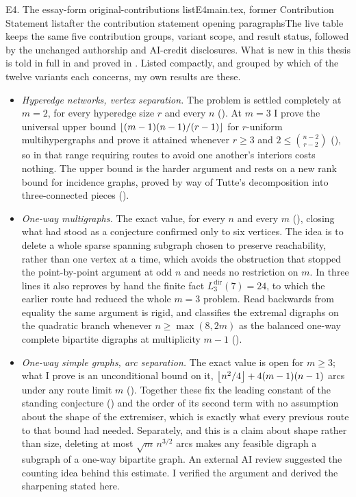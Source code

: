 \begin{offcut}{E4. The essay-form original-contributions list}{E4}{main.tex, former Contribution Statement list}{after the contribution statement opening paragraphs}{The live table keeps the same five contribution groups, variant scope, and result status, followed by the unchanged authorship and AI-credit disclosures.}
What is new in this thesis is told in full in  and proved in . Listed compactly, and grouped by which of the twelve variants each concerns, my own results are these.

\begin{itemize}
  \item \emph{Hyperedge networks, vertex separation.} The problem is settled completely at $m = 2$, for every hyperedge size $r$ and every $n$ (). At $m = 3$ I prove the universal upper bound $\left\lfloor (m-1)(n-1)/(r-1) \right\rfloor$ for $r$-uniform multihypergraphs and prove it attained whenever $r \ge 3$ and $2 \le \binom{n-2}{r-2}$ (), so in that range requiring routes to avoid one another's interiors costs nothing. The upper bound is the harder argument and rests on a new rank bound for incidence graphs, proved by way of Tutte's decomposition into three-connected pieces ().

  \item \emph{One-way multigraphs.} The exact value, for every $n$ and every $m$ (), closing what had stood as a conjecture confirmed only to six vertices. The idea is to delete a whole sparse spanning subgraph chosen to preserve reachability, rather than one vertex at a time, which avoids the obstruction that stopped the point-by-point argument at odd $n$ and needs no restriction on $m$. In three lines it also reproves by hand the finite fact $L_3^{\mathrm{dir}}(7) = 24$, to which the earlier route had reduced the whole $m = 3$ problem. Read backwards from equality the same argument is rigid, and classifies the extremal digraphs on the quadratic branch whenever $n \ge \max(8, 2m)$ as the balanced one-way complete bipartite digraphs at multiplicity $m-1$ ().

  \item \emph{One-way simple graphs, arc separation.} The exact value is open for $m \ge 3$; what I prove is an unconditional bound on it, $\left\lfloor n^2/4 \right\rfloor + 4(m-1)(n-1)$ arcs under any route limit $m$ (). Together these fix the leading constant of the standing conjecture () and the order of its second term with no assumption about the shape of the extremiser, which is exactly what every previous route to that bound had needed. Separately, and this is a claim about shape rather than size, deleting at most $\sqrt{m}\,n^{3/2}$ arcs makes any feasible digraph a subgraph of a one-way bipartite graph. An external AI review suggested the counting idea behind this estimate. I verified the argument and derived the sharpening stated here.


\end{itemize}
\end{offcut}

